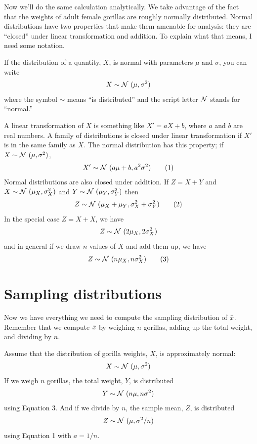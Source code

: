 \documentclass[12pt]{book}
\begin{document}
Now we'll do the same calculation analytically.  We
take advantage of the fact that the weights of adult female gorillas
are roughly normally distributed.  Normal distributions have two
properties that make them amenable for analysis: they are ``closed'' under
linear transformation and addition.  To explain what that means, I
need some notation.  

If the distribution of a quantity, $X$, is
normal with parameters $\mu$ and $\sigma$, you can write
%
\[ X \sim \mathcal{N}~(\mu, \sigma^{2})\]
%
where the symbol $\sim$ means ``is distributed'' and the script letter
$\mathcal{N}$ stands for ``normal.''


A linear transformation of $X$ is something like $X' = a X + b$, where
$a$ and $b$ are real numbers.
A family of distributions is closed under
linear transformation if $X'$ is in the same family as $X$.  The normal
distribution has this property; if $X \sim \mathcal{N}~(\mu,
\sigma^2)$,
%
\[ X' \sim \mathcal{N}~(a \mu + b, a^{2} \sigma^2) \tag*{(1)} \]
%
Normal distributions are also closed under addition.  
If $Z = X + Y$ and
$X \sim \mathcal{N}~(\mu_{X}, \sigma_{X}^{2})$ and
$Y \sim \mathcal{N}~(\mu_{Y}, \sigma_{Y}^{2})$ then
%
\[ Z \sim \mathcal{N}~(\mu_X + \mu_Y, \sigma_X^2 + \sigma_Y^2)  \tag*{(2)}\]
%
In the special case $Z = X + X$, we have
%
\[ Z \sim \mathcal{N}~(2 \mu_X, 2 \sigma_X^2) \]
%
and in general if we draw $n$ values of $X$ and add them up, we have
%
\[ Z \sim \mathcal{N}~(n \mu_X, n \sigma_X^2)  \tag*{(3)}\]


\section{Sampling distributions}

Now we have everything we need to compute the sampling distribution of
$\bar{x}$.  Remember that we compute $\bar{x}$ by weighing $n$ gorillas,
adding up the total weight, and dividing by $n$.

Assume that the distribution of gorilla weights, $X$, is
approximately normal:
%
\[ X \sim \mathcal{N}~(\mu, \sigma^2)\]
%
If we weigh $n$ gorillas, the total weight, $Y$, is distributed
%
\[ Y \sim \mathcal{N}~(n \mu, n \sigma^2) \]
%
using Equation 3.  And if we divide by $n$, the sample mean,
$Z$, is distributed
%
\[ Z \sim \mathcal{N}~(\mu, \sigma^2/n) \]
%
using Equation 1 with $a = 1/n$.
\end{document}
